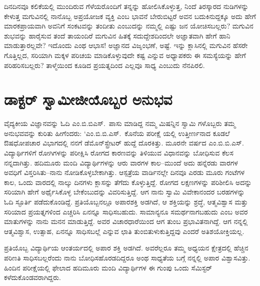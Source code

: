 ದಿನದಿನವೂ ಕಲಿಕೆಯಲ್ಲಿ ಮುಂದಿರುವ ಗೆಳೆಯರೊಂದಿಗೆ ತನ್ನನ್ನು ಹೋಲಿಸಿಕೊಳ್ಳುತ್ತ, ನಿಂದೆ ತಿರಸ್ಕಾರದ ನುಡಿಗಳನ್ನು ಕೇಳುತ್ತ ಮಗುವಿನಲ್ಲಿ ನಾನೊಬ್ಬ ಅಪ್ರಯೋಜಕ ವ್ಯಕ್ತಿ ಎಂಬ ಭಾವನೆ ಬೇರುಬಿಟ್ಟರೆ ಅವನ ಬದುಕಿನುದ್ದಕ್ಕೂ ಅದು ಹೇಗೆ ಮಾರಕಪ್ರಾಯವಾಗಿ ಅವನಿಗೆ ಸಂಕಟವನ್ನು ತಂದೀತು ಎಂಬುದನ್ನು ನಮ್ಮಲ್ಲಿ ಎಷ್ಟು ಜನ ಯೋಚಿಸಬಲ್ಲರು? ಮಗುವಿನ ಶುಭವನ್ನು ಹಾರೈಸುವ ತಂದೆ ತಾಯಂದಿರೆ ಮಗುವಿನ ಹಿತಕ್ಕೆ ಸದುದ್ದೇಶದಿಂದಲೇ ಅಜ್ಞಾತವಾಗಿ ಹೇಗೆ ಹಾನಿ ಮಾಡುತ್ತಾರಲ್ಲವೇ? ಇದೊಂದು ಎಂಥ ಆಭಾಸ! ಅಜ್ಞಾನದ ವಿಜೃಂಭಣೆ, ಅಷ್ಟೆ. ಇನ್ನು ಕ್ಲಾಸಿನಲ್ಲಿ ಮಗುವಿನ ಹೆಸರೇ ಗೊತ್ತಿಲ್ಲದ, ಸರಿಯಾಗಿ ಮಕ್ಕಳ ಪರಿಚಯ ಮಾಡಿಕೊಳ್ಳುವುದೇ ಕಷ್ಟ ಎನ್ನುವ ಅಧ್ಯಾಪಕರು ಈ ಸಮಸ್ಯೆಯನ್ನು ಹೇಗೆ ಪರಿಹರಿಸಬಲ್ಲರು? ತಾಳ್ಮೆಯಿಂದ ಕೂಡಿದ ಪ್ರಯತ್ನದಿಂದ ಎಲ್ಲವೂ ಸಾಧ್ಯ ಎಂಬುದು ನೆನಪಿರಲಿ.


\section*{ಡಾಕ್ಟರ್ ಸ್ವಾಮೀಜೀಯೊಬ್ಬರ ಅನುಭವ}


ವೈದ್ಯಕೀಯ ವಿಜ್ಞಾನವನ್ನು ಓದಿ ಎಂ.ಬಿ.ಬಿಎಸ್.\ ಪಾಸು ಮಾಡಿದ್ದ ನಮ್ಮ ಮಿಷನ್ನಿನ ಸ್ವಾಮಿ ಗಳೊಬ್ಬರು ತಮ್ಮ ಅನುಭವವನ್ನು ಕುರಿತು ಹೀಗೆಂದರು: ‘ಎಂ.ಬಿ.ಬಿ.ಎಸ್.\ ಕೊನೆಯ ಪರೀಕ್ಷೆ ಯಲ್ಲಿ ಉತ್ತೀರ್ಣನಾದ ಕೂಡಲೆ ಔಷಧೋಪಚಾರ ವಿಭಾಗದಲ್ಲಿ ನನಗೆ ಡೆಮೊನ್​ಸ್ಟ್ರೇಟರ್ ಹುದ್ದೆ ದೊರಕಿತ್ತು. ಮೂರನೇ ವರ್ಷದ ಎಂ.ಬಿ.ಬಿ.ಎಸ್. ವಿದ್ಯಾರ್ಥಿಗಳಿಗೆ ರೋಗಿಗಳನ್ನು ಪರೀಕ್ಷಿಸಿ ರೋಗದ ಕಾರಣವನ್ನು ತಿಳಿಯುವ ವಿಧಾನವನ್ನು ಬೋಧಿಸುವ ಕೆಲಸ ನನ್ನದಾಗಿತ್ತು. ಹದಿಮೂರು ಮಂದಿ ವಿದ್ಯಾರ್ಥಿಗಳನ್ನು ಆರು ವಾರಗಳ ಕಾಲ–ಮುಂದೆ ಅದು ಹನ್ನೆರಡು ವಾರಗಳ ಅವಧಿಗೆ ವಿಸ್ತರಿಸಿತು–ನಾನು ನೋಡಿಕೊಳ್ಳಬೇಕಾಗಿತ್ತು. ಆಸ್ಪತ್ರೆಯ ವಾರ್ಡಿನಲ್ಲೇ ದಿನವೂ ಎರಡು ಮೂರು ಗಂಟೆಗಳ ಕಾಲ, ಒಂದು ವಾರದಲ್ಲಿ ನಾಲ್ಕು ದಿನಗಳು ಕ್ಲಾಸನ್ನು ತೆಗೆದು ಕೊಳ್ಳುತ್ತಿದ್ದೆ. ರೋಗದ ಲಕ್ಷಣಗಳನ್ನು ಪರಿಶೀಲಿಸಿ ಅದನ್ನು ಸರಿಯಾಗಿ ಹೇಗೆ ಅರ್ಥೈಸಿಕೊಳ್ಳ ಬೇಕೆಂಬುದನ್ನು ವಿವರಿಸುತ್ತಿದ್ದೆ. ಆಗ ನಾನು ಸ್ವಾಮಿ ವಿವೇಕಾನಂದರ ಬರಹಗಳನ್ನು ಓದಿ ಸ್ಫೂರ್ತಿ ಪಡೆದುಕೊಂಡಿದ್ದೆ. ಪ್ರತಿಯೊಬ್ಬ\-ನಲ್ಲೂ ಅಪಾರಶಕ್ತಿ ಅಡಗಿದೆ, ಆ ಶಕ್ತಿಯನ್ನು ಶ್ರದ್ಧೆ, ಆತ್ಮವಿಶ್ವಾಸ ಮತ್ತು ಸರಿಯಾದ ಪ್ರಯತ್ನಗಳಿಂದ ಎಚ್ಚರಿಸಿ ಏನನ್ನೂ ಸಾಧಿಸಬಹುದು. ಸಾಮಾನ್ಯನೂ ಸಮರ್ಥನಾಗಬಹುದು ಎಂಬ ಅವರ ಮಾತುಗಳನ್ನು ನಾನು ಮನನ ಮಾಡುತ್ತಿದ್ದೆ. ಅವರ ವಿಚಾರಧಾರೆಯಿಂದ ಆಗ ತುಂಬ ಪ್ರಭಾವಿತನಾಗಿದ್ದೆ. ಆಗ ನನ್ನಲ್ಲಿ ಆತ್ಮವಿಶ್ವಾಸ, ಉತ್ಸಾಹ, ಏನನ್ನೂ ಸಾಧಿಸಬಲ್ಲೆ ಎನ್ನುವ ಛಾತಿ ತುಂಬಿತುಳುಕುತ್ತಿದ್ದವು ಎಂದರೆ ಅತಿಶಯೋಕ್ತಿಯಲ್ಲ.

ಪ್ರತಿಯೊಬ್ಬ ವಿದ್ಯಾರ್ಥಿಯ ಆಂತರ್ಯದಲ್ಲಿ ಅಪಾರ ಶಕ್ತಿ ಅಡಗಿದೆ. ಅವರೆಲ್ಲರೂ ತಮ್ಮ ಅಧ್ಯಯನ ಕ್ಷೇತ್ರದಲ್ಲಿ ಹೆಚ್ಚಿನ ಪರಿಣತಿ ಸಾಧಿಸಬಲ್ಲರೆಂದು ನಾನು ಬೋಧಿಸಹೊರಡದಿದ್ದರೂ ಅಂಥ ಸಾಧ್ಯತೆಯ ಬಗ್ಗೆ ನನ್ನಲ್ಲಿ ಅಪಾರ ವಿಶ್ವಾಸವಿತ್ತು. ಹಿಂದಿನ ಪರೀಕ್ಷೆಯಲ್ಲಿ ಫೇಲಾದ ಹದಿಮೂರು ಮಂದಿ ವಿದ್ಯಾರ್ಥಿಗಳ ಈ ಗುಂಪು ಒಂದು ಸೆಮಿಸ್ಟರ್ ಕಳೆದುಕೊಂಡವರಾಗಿದ್ದರು.

